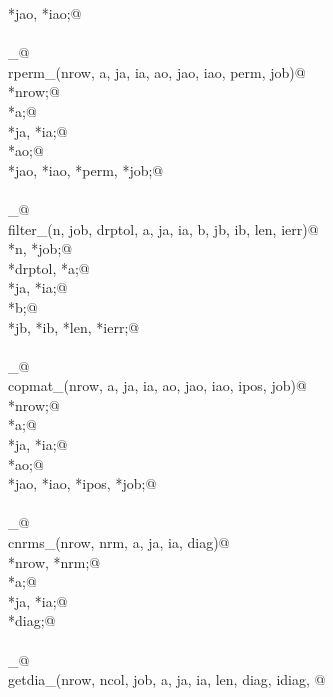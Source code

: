 \documentclass[12pt]{article}
\begin{document}
\begin{flushleft}
\begin{minipage}{\linewidth}
\begin{list}{}{}
\mbox{}\verb@integer *jao, *iao;@\\
\mbox{}\verb@@\\
\mbox{}\verb@rperm_@\\
\mbox{}\verb@int rperm_(nrow, a, ja, ia, ao, jao, iao, perm, job)@\\
\mbox{}\verb@integer *nrow;@\\
\mbox{}\verb@doublereal *a;@\\
\mbox{}\verb@integer *ja, *ia;@\\
\mbox{}\verb@doublereal *ao;@\\
\mbox{}\verb@integer *jao, *iao, *perm, *job;@\\
\mbox{}\verb@@\\
\mbox{}\verb@filter_@\\
\mbox{}\verb@int filter_(n, job, drptol, a, ja, ia, b, jb, ib, len, ierr)@\\
\mbox{}\verb@integer *n, *job;@\\
\mbox{}\verb@doublereal *drptol, *a;@\\
\mbox{}\verb@integer *ja, *ia;@\\
\mbox{}\verb@doublereal *b;@\\
\mbox{}\verb@integer *jb, *ib, *len, *ierr;@\\
\mbox{}\verb@@\\
\mbox{}\verb@copmat_@\\
\mbox{}\verb@int copmat_(nrow, a, ja, ia, ao, jao, iao, ipos, job)@\\
\mbox{}\verb@integer *nrow;@\\
\mbox{}\verb@doublereal *a;@\\
\mbox{}\verb@integer *ja, *ia;@\\
\mbox{}\verb@doublereal *ao;@\\
\mbox{}\verb@integer *jao, *iao, *ipos, *job;@\\
\mbox{}\verb@@\\
\mbox{}\verb@cnrms_@\\
\mbox{}\verb@int cnrms_(nrow, nrm, a, ja, ia, diag)@\\
\mbox{}\verb@integer *nrow, *nrm;@\\
\mbox{}\verb@doublereal *a;@\\
\mbox{}\verb@integer *ja, *ia;@\\
\mbox{}\verb@doublereal *diag;@\\
\mbox{}\verb@@\\
\mbox{}\verb@getdia_@\\
\mbox{}\verb@int getdia_(nrow, ncol, job, a, ja, ia, len, diag, idiag, @\\

\end{list}
\end{minipage}
\end{flushleft}
\end{document}
